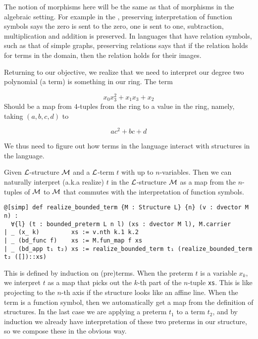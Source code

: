 \begin{dfn}
      The notion of morphisms here will be the same as that of
      morphisms in the algebraic setting.
      For example in the ,
      preserving interpretation of function symbols says
      the zero is sent to the zero, one is sent to one,
      subtraction, multiplication and addition is preserved.
      In languages that have relation symbols,
      such as that of simple graphs, preserving relations says that
      if the relation holds for terms in the domain,
      then the relation holds for their images.
\end{dfn}

Returning to our objective,
we realize that we need to interpret our degree two polynomial (a term)
is something in our ring. The term

\[ x_{0} x_{3}^{2} + x_{1} x_{3} + x_{2} \]
Should be a map from $4$-tuples from the ring to a value in the ring,
namely, taking $(a, b, c, d)$ to

\[ a c^{2} + b c + d \]

We thus need to figure out how terms in the language interact with
structures in the language.

\begin{dfn}
    Given $\mathcal{L}$-structure $\mathcal{M}$ and a $\mathcal{L}$-term $t$ with up to $n$-variables.
    Then we can naturally interpret (a.k.a realize) $t$ in the $\mathcal{L}$-structure $\mathcal{M}$ as a
    map from the $n$-tuples of $\mathcal{M}$ to $\mathcal{M}$ that
    commutes with the interpretation of function symbols.

    \begin{lstlisting}
@[simp] def realize_bounded_term {M : Structure L} {n} (v : dvector M n) :
  ∀{l} (t : bounded_preterm L n l) (xs : dvector M l), M.carrier
| _ (x_ k)         xs := v.nth k.1 k.2
| _ (bd_func f)    xs := M.fun_map f xs
| _ (bd_app t₁ t₂) xs := realize_bounded_term t₁ (realize_bounded_term t₂ ([])::xs) \end{lstlisting}

    This is defined by induction on (pre)terms.
    When the preterm $t$ is a variable $x_{k}$, we interpret $t$ as a map
    that picks out the $k$-th part of the $n$-tuple \texttt{xs}.
    This is like projecting to the $n$-th axis if the structure looks like an affine line.
    When the term is a function symbol, then we automatically get a map from the
    definition of structures.
    In the last case we are applying a preterm $t_{1}$ to a term $t_{2}$,
    and by induction we already have interpretation of these two preterms
    in our structure, so we compose these in the obvious way.
\end{dfn}

